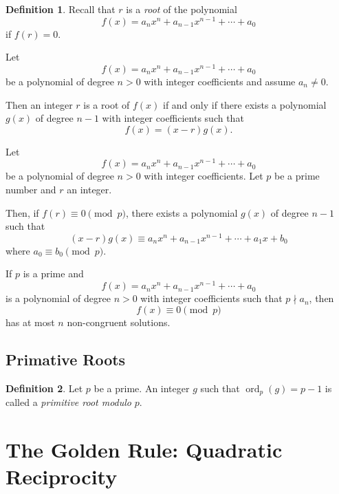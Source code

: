\documentclass{article}
\theoremstyle{definition}
\newtheorem{definition}{Definition}
\newenvironment{manualtheorem}[1]{%
  \renewcommand{\thetheorem}{#1}%
  \theorem%
}{%
  \endtheorem%
}
\begin{document}
\begin{definition}
	Recall that $r$ is a \emph{root} of the polynomial
	\[
		f(x) = a_n x^n + a_{n-1} x^{n-1} + \cdots + a_0
	\]
	if $f(r) = 0$.
\end{definition}

\begin{manualtheorem}{6.1}
	Let
	\[
		f(x) = a_n x^n + a_{n-1} x^{n-1} + \cdots + a_0
	\]
	be a polynomial of degree $n > 0$ with integer coefficients and assume $a_n \neq 0$.

	Then an integer $r$ is a root of $f(x)$ if and only if there exists a polynomial $g(x)$ of degree $n - 1$ with integer coefficients such that
	\[
		f(x) = (x - r)g(x).
	\]
\end{manualtheorem}

\begin{manualtheorem}{6.2}
	Let
	\[
		f(x) = a_n x^n + a_{n-1} x^{n-1} + \cdots + a_0
	\]
	be a polynomial of degree $n > 0$ with integer coefficients. Let $p$ be a prime number and $r$ an integer.

	Then, if $f(r) \equiv 0 \pmod{p}$, there exists a polynomial $g(x)$ of degree $n - 1$ such that
	\[
		(x - r)g(x) \equiv a_n x^n + a_{n-1} x^{n-1} + \cdots + a_1 x + b_0
	\]
	where $a_0 \equiv b_0 \pmod{p}$.
\end{manualtheorem}

\begin{manualtheorem}{6.3}[Lagrange's Theorem]
	If $p$ is a prime and
	\[
		f(x) = a_n x^n + a_{n-1} x^{n-1} + \cdots + a_0
	\]
	is a polynomial of degree $n > 0$ with integer coefficients such that $p \nmid a_n$, then
	\[
		f(x) \equiv 0 \pmod{p}
	\]
	has at most $n$ non-congruent solutions.
\end{manualtheorem}

\subsection{Primative Roots}

\begin{definition}
	Let $p$ be a prime. An integer $g$ such that $\operatorname{ord}_p(g) = p - 1$ is called a \emph{primitive root modulo} $p$.
\end{definition}

\pagebreak

\section{The Golden Rule: Quadratic Reciprocity}
\end{document}
